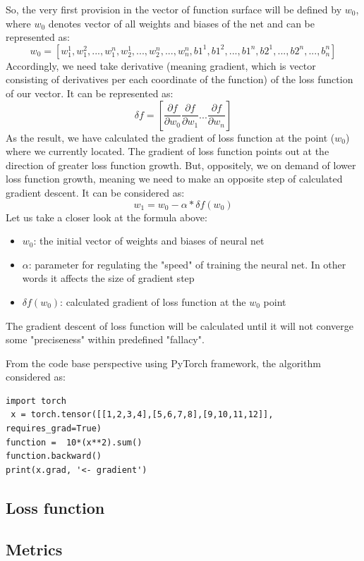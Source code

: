 So, the very first provision in the vector of function surface will be defined by $w_0$, where $w_0$ denotes vector of all weights and biases of the net and can be represented as: 
\[ w_0 = [w_1^1, w_1^2,...,w_1^n, w_2^1,...,w_2^n,...,w_n^n, b1^1, b1^2,...,b1^n, b2^1,...,b2^n,...,b_n^n] \]
Accordingly, we need take derivative (meaning gradient, which is vector consisting of derivatives per each coordinate of the function) of the loss function of our vector. It can be represented as:
\[ \delta{f} = [\frac{\partial{f}}{\partial{w_0}} \frac{\partial{f}}{\partial{w_1}} ... \frac{\partial{f}}{\partial{w_n}} ] \]
As the result, we have calculated the gradient of loss function at the point ($w_0$) where we currently located. The gradient of loss function points out at the direction of greater loss function growth. But, oppositely, we on demand of lower loss function growth, meaning we need to make an opposite step of calculated gradient descent. It can be considered as:
\[ w_1 = w_0 - \alpha*\delta{f(w_0)} \]
Let us take a closer look at the formula above:
\begin{itemize}
    \item $w_0$: the initial vector of weights and biases of neural net
    \item $\alpha$: parameter for regulating the "speed" of training the neural net. In other words it affects the size of gradient step 
    \item $\delta{f(w_0)}$: calculated gradient of loss function at the $w_0$ point 
\end{itemize}
The gradient descent of loss function will be calculated until it will not converge some "preciseness" within predefined "fallacy".


From the code base perspective using PyTorch framework, the algorithm considered as:
\begin{lstlisting}
import torch
 x = torch.tensor([[1,2,3,4],[5,6,7,8],[9,10,11,12]],                requires_grad=True) 
function =  10*(x**2).sum()
function.backward()
print(x.grad, '<- gradient')
\end{lstlisting}

\subsection{Loss function}
\subsection{Metrics}


